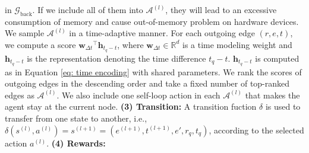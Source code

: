 \documentclass[runningheads]{llncs}
\begin{document}
in $\mathcal{G}_{\text{back}}$. If we include all of them into $\mathcal{A}^{(l)}$, they will lead to an 
excessive consumption of memory and cause out-of-memory problem on hardware devices. 
We sample $\mathcal{A}^{(l)}$ in a time-adaptive manner. For each outgoing edge $(r,e,t)$, we compute a score 
${\mathbf{w}_{\Delta t}}^\top \mathbf{h}_{t_q - t}$, where $\mathbf{w}_{\Delta t} \in \mathbb{R}^d$ is a 
time modeling weight and $\mathbf{h}_{t_q - t}$ is the representation denoting the time difference 
$t_q-t$. $\mathbf{h}_{t_q - t}$ is computed as in Equation \ref{eq: time encoding} with shared parameters. 
We rank the scores of outgoing edges in the descending order and 
take a fixed number of top-ranked edges as $\mathcal{A}^{(l)}$. We also include one self-loop action in each $\mathcal{A}^{(l)}$ that makes the agent stay at the current node.
\textbf{(3) Transition:} A transition fuction $\delta$
is used to transfer from one state to another, i.e., $\delta(s^{(l)}, a^{(l)}) = s^{(l+1)} = (e^{(l+1)}, t^{(l+1)}, e', r_q, t_q)$, according to the selected action $a^{(l)}$.
\textbf{(4) Rewards:} 
\end{document}
